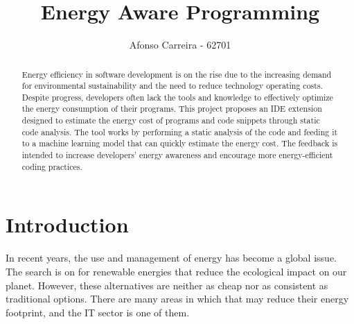 \documentclass[sigplan]{acmart}
\begin{document}
\title{Energy Aware Programming}

\author{Afonso Carreira - 62701}


\begin{abstract}
  Energy efficiency in software development is on the rise due to the increasing demand for environmental sustainability and the need to reduce technology operating costs. Despite progress, developers often lack the tools and knowledge to effectively optimize the energy consumption of their programs. This project proposes an IDE extension designed to estimate the energy cost of programs and code snippets through static code analysis. The tool works by performing a static analysis of the code and feeding it to a machine learning model that can quickly estimate the energy cost. The feedback is intended to increase developers' energy awareness and encourage more energy-efficient coding practices.
\end{abstract}



\pagestyle{plain} %

\maketitle
\section{Introduction}

In recent years, the use and management of energy has become a global issue. The search is on for renewable energies that reduce the ecological impact on our planet. However, these alternatives are neither as cheap nor as consistent as traditional options. There are many areas in which that may reduce their energy footprint, and the IT sector is one of them.
\end{document}
